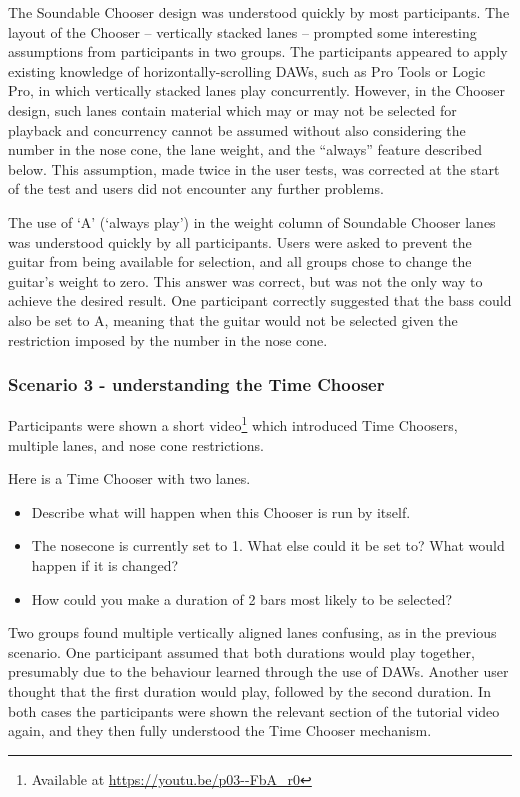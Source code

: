 \documentclass{ppig}
\begin{document}
The Soundable Chooser design was understood quickly by most
participants. The layout of the Chooser -- vertically stacked lanes --
prompted some interesting assumptions from participants in two groups.
The participants appeared to apply existing knowledge of
horizontally-scrolling DAWs, such as Pro Tools or Logic Pro, in which
vertically stacked lanes play concurrently. However, in the Chooser
design, such lanes contain material which may or may not be selected for
playback and concurrency cannot be assumed without also considering the
number in the nose cone, the lane weight, and the ``always'' feature
described below. This assumption, made twice in the user tests, was
corrected at the start of the test and users did not encounter any
further problems.

The use of `A' (`always play') in the weight column of Soundable Chooser
lanes was understood quickly by all participants. Users were asked to
prevent the guitar from being available for selection, and all groups
chose to change the guitar's weight to zero. This answer was correct,
but was not the only way to achieve the desired result. One participant
correctly suggested that the bass could also be set to A, meaning that
the guitar would not be selected given the restriction imposed by the
number in the nose cone.

\hypertarget{sec:scenariothree}{%
\subsubsection{Scenario 3 - understanding the Time
Chooser}\label{sec:scenariothree}}

Participants were shown a short video\footnote{Available at
  \url{https://youtu.be/p03--FbA_r0}} which introduced Time Choosers,
multiple lanes, and nose cone restrictions.

Here is a Time Chooser with two lanes.

\begin{itemize}
\item
  Describe what will happen when this Chooser is run by itself.
\item
  The nosecone is currently set to 1. What else could it be set to? What
  would happen if it is changed?
\item
  How could you make a duration of 2 bars most likely to be selected?
\end{itemize}

Two groups found multiple vertically aligned lanes confusing, as in the
previous scenario. One participant assumed that both durations would
play together, presumably due to the behaviour learned through the use
of DAWs. Another user thought that the first duration would play,
followed by the second duration. In both cases the participants were
shown the relevant section of the tutorial video again, and they then
fully understood the Time Chooser mechanism.
\end{document}
